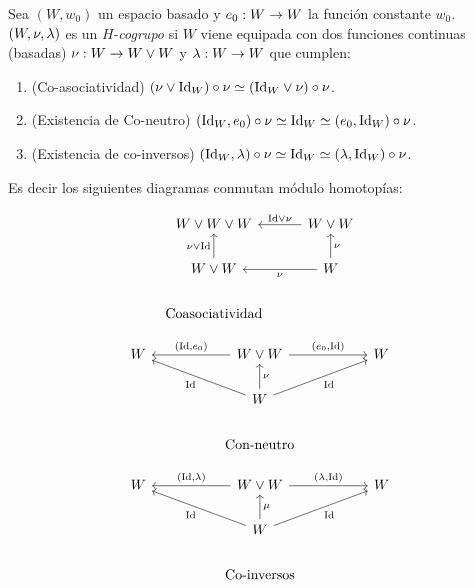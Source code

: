 \documentclass[../../topologia_algebraica]{subfiles}
\begin{document}
\begin{defin}
   Sea $(W,w_0)$ un espacio basado y $e_0:W\rightarrow W$ la funci\'on constante $w_0$. $(W,\nu,\lambda)$ es un
  $H$-\emph{cogrupo} si $W$ viene equipada con dos funciones continuas (basadas)
  $\nu:W \rightarrow W\vee W$ y $\lambda:W\rightarrow W$ que cumplen:
  \begin{enumerate}
  \item (Co-asociatividad) $(\nu\vee\text{Id}_W)\circ\nu\simeq(\text{Id}_W\vee\nu)\circ\nu$.
  \item (Existencia de Co-neutro) $(\text{Id}_W,e_0)\circ\nu\simeq\text{Id}_W\simeq(e_0,\text{Id}_W)\circ\nu$.
  \item (Existencia de co-inversos) $(\text{Id}_W,\lambda)\circ\nu\simeq\text{Id}_W\simeq(\lambda,\text{Id}_W)\circ\nu$.
  \end{enumerate}

  Es decir los siguientes diagramas conmutan m\'odulo homotop\'ias:
  
\noindent\footnotesize\begin{minipage}{.3\textwidth}%
\[
  \begin{tikzcd}
    W\vee W\vee W \arrow[r,leftarrow,"\Id\vee\nu"] \arrow[d,leftarrow,"\nu\vee\Id"'] &
    W\vee W \arrow[d,leftarrow,"\nu"] \\
    W\vee W \arrow[r,leftarrow,"\nu"'] & W \\ \text{Coasociatividad} &
  \end{tikzcd}
\]
 \end{minipage}
 \begin{minipage}{.35\textwidth}
\[
  \begin{tikzcd}
    W \arrow[rr,leftarrow,"(\Id\text{,}e_0)"] \arrow[rrd,leftarrow,"\Id"']& &
    W\vee W \arrow[d,leftarrow,leftarrow,"\nu"]
    & & W \arrow[ll,leftarrow,"(e_0\text{,}\Id)"'] \arrow[lld,leftarrow,"\Id"]\\
    && W && \\ && \text{Con-neutro} &&
  \end{tikzcd}
\]
\end{minipage}
\begin{minipage}{0.35\textwidth}
\[
  \begin{tikzcd}
    W \arrow[rr,leftarrow,"(\Id\text{,}\la)"] \arrow[rrd,leftarrow,"\Id"']& &
    W\vee W \arrow[d,leftarrow,"\mu"]
    & & W \arrow[ll,leftarrow,"(\la\text{,}\Id)"'] \arrow[lld,leftarrow,"\Id"]\\
    && W && \\ && \text{Co-inversos} &&
  \end{tikzcd}
\]
\end{minipage}\normalsize%
\end{defin}
\end{document}
